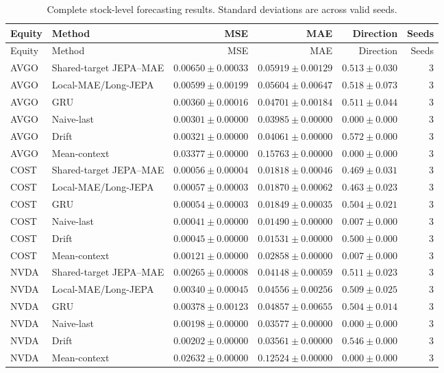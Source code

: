 \begin{longtable}{llrrrr}
\caption{Complete stock-level forecasting results. Standard deviations are across valid seeds.}\label{tab:appendix_stock_metrics}\\
\toprule
Equity & Method & MSE & MAE & Direction & Seeds \\
\midrule
\endfirsthead
\toprule
Equity & Method & MSE & MAE & Direction & Seeds \\
\midrule
\endhead
AVGO & Shared-target JEPA--MAE & $0.00650 \pm 0.00033$ & $0.05919 \pm 0.00129$ & $0.513 \pm 0.030$ & 3 \\
AVGO & Local-MAE/Long-JEPA & $0.00599 \pm 0.00199$ & $0.05604 \pm 0.00647$ & $0.518 \pm 0.073$ & 3 \\
AVGO & GRU & $0.00360 \pm 0.00016$ & $0.04701 \pm 0.00184$ & $0.511 \pm 0.044$ & 3 \\
AVGO & Naive-last & $0.00301 \pm 0.00000$ & $0.03985 \pm 0.00000$ & $0.000 \pm 0.000$ & 3 \\
AVGO & Drift & $0.00321 \pm 0.00000$ & $0.04061 \pm 0.00000$ & $0.572 \pm 0.000$ & 3 \\
AVGO & Mean-context & $0.03377 \pm 0.00000$ & $0.15763 \pm 0.00000$ & $0.000 \pm 0.000$ & 3 \\
COST & Shared-target JEPA--MAE & $0.00056 \pm 0.00004$ & $0.01818 \pm 0.00046$ & $0.469 \pm 0.031$ & 3 \\
COST & Local-MAE/Long-JEPA & $0.00057 \pm 0.00003$ & $0.01870 \pm 0.00062$ & $0.463 \pm 0.023$ & 3 \\
COST & GRU & $0.00054 \pm 0.00003$ & $0.01849 \pm 0.00035$ & $0.504 \pm 0.021$ & 3 \\
COST & Naive-last & $0.00041 \pm 0.00000$ & $0.01490 \pm 0.00000$ & $0.007 \pm 0.000$ & 3 \\
COST & Drift & $0.00045 \pm 0.00000$ & $0.01531 \pm 0.00000$ & $0.500 \pm 0.000$ & 3 \\
COST & Mean-context & $0.00121 \pm 0.00000$ & $0.02858 \pm 0.00000$ & $0.007 \pm 0.000$ & 3 \\
NVDA & Shared-target JEPA--MAE & $0.00265 \pm 0.00008$ & $0.04148 \pm 0.00059$ & $0.511 \pm 0.023$ & 3 \\
NVDA & Local-MAE/Long-JEPA & $0.00340 \pm 0.00045$ & $0.04556 \pm 0.00256$ & $0.509 \pm 0.025$ & 3 \\
NVDA & GRU & $0.00378 \pm 0.00123$ & $0.04857 \pm 0.00655$ & $0.504 \pm 0.014$ & 3 \\
NVDA & Naive-last & $0.00198 \pm 0.00000$ & $0.03577 \pm 0.00000$ & $0.000 \pm 0.000$ & 3 \\
NVDA & Drift & $0.00202 \pm 0.00000$ & $0.03561 \pm 0.00000$ & $0.546 \pm 0.000$ & 3 \\
NVDA & Mean-context & $0.02632 \pm 0.00000$ & $0.12524 \pm 0.00000$ & $0.000 \pm 0.000$ & 3 \\
\bottomrule
\end{longtable}
